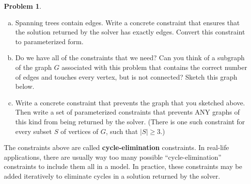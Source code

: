 \documentclass[11pt]{article}
\theoremstyle{definition}
\newtheorem{problem}{Problem}
\newcommand{\answerbox}[3]{%
  \fbox{%
    \begin{minipage}[#1]{#2}
      \hfill\vspace{#3}
    \end{minipage}
  }
}
\newcommand{\answerboxone}[2]{%
  \answerbox{#1}{6.0in}{#2} 
}
\newcommand{\catbox}{\answerbox{c}{.5in}{.7cm}}
\newcommand{\letterbox}{\answerbox{c}{.7cm}{.7cm}}
\begin{document}
\begin{problem}
\begin{enumerate}[(a)]
\item Spanning trees contain \catbox edges.  Write a concrete constraint that ensures that the solution returned by the solver has exactly \letterbox edges.  Convert this constraint to parameterized form.

\answerboxone{c}{8cm}

\newpage
\item Do we have all of the constraints that we need?  Can you think of a subgraph of the graph $G$ associated with this problem that contains the correct number of edges and touches every vertex, but is not connected?  Sketch this graph below.

\answerboxone{c}{6cm}

\item Write a concrete constraint that prevents the graph that you sketched above.  Then write a set of parameterized constraints that prevents ANY graphs of this kind from being returned by the solver.  (There is one such constraint for every subset $S$ of vertices of $G$, such that $|S| \geq 3$.)

\answerboxone{c}{8cm}



\end{enumerate}

\end{problem}

\begin{tcolorbox}
The constraints above are called \textbf{cycle-elimination} constraints.  In real-life applications, there are usually way too many possible ``cycle-elimination'' constraints to include them all in a model.  In practice, these constraints may be added iteratively to eliminate cycles in a solution returned by the solver. 
\end{tcolorbox}
\end{document}
